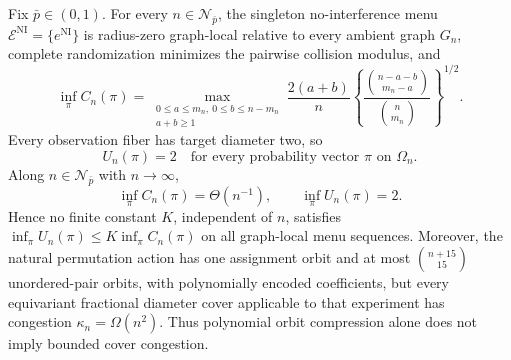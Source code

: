 Fix \(\bar p\in(0,1)\). For every \(n\in\mathcal N_{\bar p}\), the singleton no-interference menu \(\mathcal E^{\mathrm{NI}}=\{e^{\mathrm{NI}}\}\) is radius-zero graph-local relative to every ambient graph \(G_n\), complete randomization minimizes the pairwise collision modulus, and
\[
 \inf_\pi C_n(\pi)
 =
 \max_{\substack{0\le a\le m_n,\ 0\le b\le n-m_n\\a+b\ge1}}
 \frac{2(a+b)}{n}
 \left\{
 \frac{\binom{n-a-b}{m_n-a}}{\binom n{m_n}}
 \right\}^{1/2}. \tag{1}
\]
Every observation fiber has target diameter two, so
\[
 U_n(\pi)=2\quad\text{for every probability vector \(\pi\) on \(\Omega_n\)}. \tag{2}
\]
Along \(n\in\mathcal N_{\bar p}\) with \(n\to\infty\),
\[
 \inf_\pi C_n(\pi)=\Theta(n^{-1}),
 \qquad
 \inf_\pi U_n(\pi)=2. \tag{3}
\]
Hence no finite constant \(K\), independent of \(n\), satisfies \(\inf_\pi U_n(\pi)\le K\inf_\pi C_n(\pi)\) on all graph-local menu sequences. Moreover, the natural permutation action has one assignment orbit and at most \(\binom{n+15}{15}\) unordered-pair orbits, with polynomially encoded coefficients, but every equivariant fractional diameter cover applicable to that experiment has congestion \(\kappa_n=\Omega(n^2)\). Thus polynomial orbit compression alone does not imply bounded cover congestion.